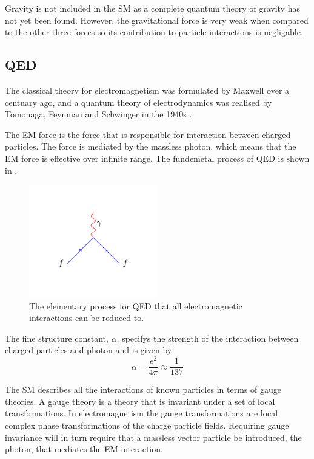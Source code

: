 Gravity is not included in the \ac{SM} as a complete quantum theory of gravity
has not yet been found. However, the gravitational force is very weak when
compared to the other three forces so its contribution to particle interactions
is negligable.

\subsection{QED}
The classical theory for electromagnetism was formulated by Maxwell over a
centuary ago\cite{maxwell}, and a quantum theory of electrodynamics was
realised by Tomonaga, Feynman and Schwinger in the 1940s \cite{qed}.

The \ac{EM} force is the force that is responsible for interaction between
charged particles. The force is mediated by the massless photon, which means
that the \ac{EM} force is effective over infinite range.
The fundemetal process of \ac{QED} is shown in .
\begin{figure}[htbp]
  \centering
  \includegraphics[width=0.5\textwidth]{qed_process}
  \caption{The elementary process for \ac{QED} that all electromagnetic
interactions can be reduced to.}
  \label{fig:qed}
\end{figure}

The fine structure constant, $\alpha$, specifys the strength of the interaction
between charged particles and photon and is given by
\begin{equation}
\alpha = \frac{e^2}{4 \pi} \approx \frac{1}{137}
\end{equation}

The \ac{SM} describes all the interactions of known particles in terms of gauge
theories. A gauge theory is a theory that is invariant under a set of local
transformations.  In electromagnetism the gauge transformations are local
complex phase transformations of the charge particle fields. Requiring gauge
invariance will in turn require that a massless vector particle be introduced,
the photon, that mediates the \ac{EM} interaction.

